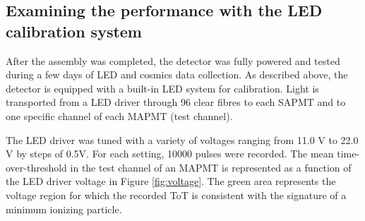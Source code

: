 \documentclass[a4paper,11pt]{article}
\begin{document}
\subsection{Examining the performance with the LED calibration system}\label{sec:led_perf}
After the assembly was completed, the detector was fully powered and tested during a few days of LED and cosmics data collection. As described above,
the detector is equipped with a built-in LED system for calibration.  Light is transported from a LED driver through 96 clear fibres to each SAPMT and to
one specific channel of each MAPMT (test channel). 

The LED driver was tuned with a variety of voltages ranging from 11.0 V to 22.0 V by steps of 0.5V. For
each setting, 10000 pulses were recorded. The mean time-over-threshold in the test channel of an MAPMT is represented as a function of the LED driver voltage in Figure
\ref{fig:voltage}. The green area represents the voltage region for which the recorded ToT is consistent with the signature of a minimum ionizing particle.
\end{document}
